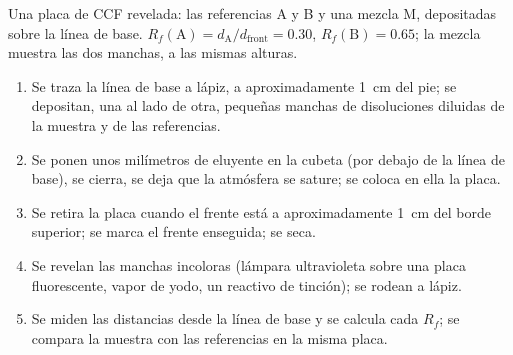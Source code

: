 \begin{omfigure}

{\small Una placa de CCF revelada: las referencias A y B y una mezcla M,
depositadas sobre la línea de base. $R_f(\mathrm{A}) = d_{\mathrm{A}}/d_{\mathrm{front}}
= 0.30$, $R_f(\mathrm{B}) = 0.65$; la mezcla muestra las dos manchas, a
las mismas alturas.}
\end{omfigure}

\begin{method}\label{met:b1:lab-techniques-1:tlc}
\begin{enumerate}
  \item Se traza la línea de base a lápiz, a aproximadamente \qty{1}{cm}
        del pie; se depositan, una al lado de otra, pequeñas manchas de
        disoluciones diluidas de la muestra y de las referencias.
  \item Se ponen unos milímetros de eluyente en la cubeta (por debajo de
        la línea de base), se cierra, se deja que la atmósfera se sature;
        se coloca en ella la placa.
  \item Se retira la placa cuando el frente está a aproximadamente
        \qty{1}{cm} del borde superior; se marca el frente enseguida; se
        seca.
  \item Se revelan las manchas incoloras (lámpara ultravioleta sobre una
        placa fluorescente, vapor de yodo, un reactivo de tinción); se
        rodean a lápiz.
  \item Se miden las distancias desde la línea de base y se calcula cada
        $R_f$; se compara la muestra con las referencias en la misma
        placa.
\end{enumerate}
\end{method}

